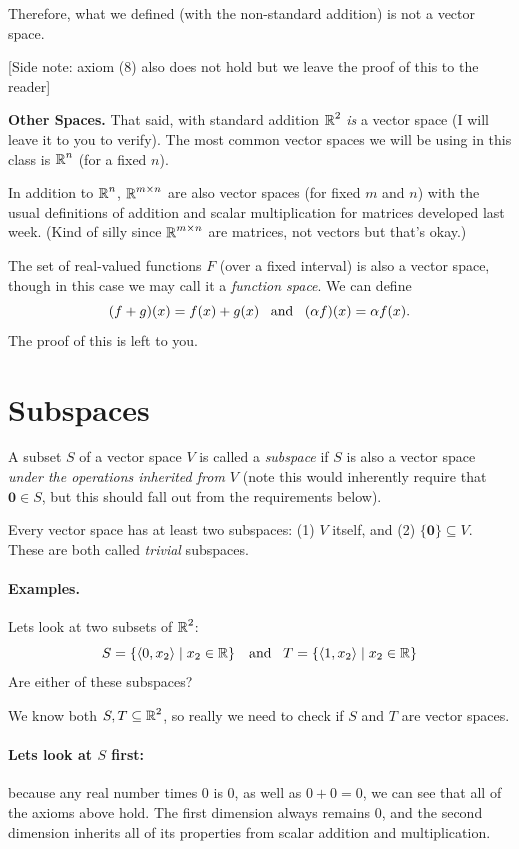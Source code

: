 Therefore, what we defined (with the non-standard addition) is not a vector space. 

[Side note: axiom (8) also does not hold but we leave the proof of this to the reader]

\textbf{Other Spaces.} 
That said, with standard addition $\operatorname{\mathbb{R}}^2$ \emph{is} a vector space (I will leave it to you to verify).
The most common vector spaces we will be using in this class is $\operatorname{\mathbb{R}}^n$ (for a fixed $n$).

In addition to $\operatorname{\mathbb{R}}^n$, $\operatorname{\mathbb{R}}^{m\times n}$ are also vector spaces (for fixed $m$ and $n$)
with the usual definitions of addition and scalar multiplication for matrices developed last week. 
(Kind of silly since $\operatorname{\mathbb{R}}^{m\times n}$ are matrices, not vectors but that's okay.)

The set of real-valued functions $F$ (over a fixed interval) is also a vector space, 
though in this case we may call it a \emph{function space}. 
We can define 
\[(f+g)(x) = f(x) + g(x) \;\;\;\textnormal{and}\;\;\; (\alpha f)(x) = \alpha f(x).\]
The proof of this is left to you. 

\section{Subspaces}
A subset $S$ of a vector space $V$ is called a \emph{subspace} if $S$ is also a vector space \textit{under the operations inherited from $V$ } (note this would inherently require that $\mathbf{0}\in S$, but this should fall out from the requirements below).

Every vector space has at least two subspaces: (1) $V$ itself, and (2) $\{\mathbf{0}\}\subseteq V$. 
These are both called \textit{trivial} subspaces. 

\paragraph{Examples.} 
Lets look at two subsets of $\operatorname{\mathbb{R}}^2$:
\[S = \left\{\left\langle 0, x_2\right\rangle \mid x_2 \in \operatorname{\mathbb{R}}\right\} \;\;\;\textnormal{and}\;\;\;
T = \left\{\left\langle 1, x_2\right\rangle \mid x_2 \in \operatorname{\mathbb{R}}\right\}\]
Are either of these subspaces? 

We know both $S, T \subseteq \operatorname{\mathbb{R}}^2$, so really we need to check if $S$ and $T$ are vector spaces. 

\paragraph{Lets look at $S$ first: }
because any real number times 0 is 0, as well as $0+0=0$, we can see that all of the axioms above hold. 
The first dimension always remains $0$, and the second dimension inherits all of its properties from scalar addition and multiplication. 

